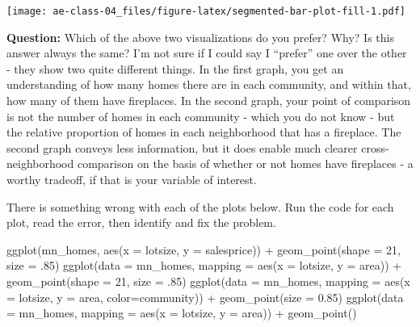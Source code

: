 \documentclass[
]{article}
\newenvironment{Shaded}{\begin{snugshade}}{\end{snugshade}}
\newcommand{\AttributeTok}[1]{\textcolor[rgb]{0.77,0.63,0.00}{#1}}
\newcommand{\DecValTok}[1]{\textcolor[rgb]{0.00,0.00,0.81}{#1}}
\newcommand{\FloatTok}[1]{\textcolor[rgb]{0.00,0.00,0.81}{#1}}
\newcommand{\FunctionTok}[1]{\textcolor[rgb]{0.00,0.00,0.00}{#1}}
\newcommand{\NormalTok}[1]{#1}
\newcommand{\SpecialCharTok}[1]{\textcolor[rgb]{0.00,0.00,0.00}{#1}}
\begin{document}
\texttt{[image: ae-class-04\_files/figure-latex/segmented-bar-plot-fill-1.pdf]}

\textbf{Question:} Which of the above two visualizations do you prefer?
Why? Is this answer always the same? I'm not sure if I could say I
``prefer'' one over the other - they show two quite different things. In
the first graph, you get an understanding of how many homes there are in
each community, and within that, how many of them have fireplaces. In
the second graph, your point of comparison is not the number of homes in
each community - which you do not know - but the relative proportion of
homes in each neighborhood that has a fireplace. The second graph
conveys less information, but it does enable much clearer
cross-neighborhood comparison on the basis of whether or not homes have
fireplaces - a worthy tradeoff, if that is your variable of interest.

There is something wrong with each of the plots below. Run the code for
each plot, read the error, then identify and fix the problem.

\begin{Shaded}
\begin{Highlighting}[]
\FunctionTok{ggplot}\NormalTok{(mn\_homes, }\FunctionTok{aes}\NormalTok{(}\AttributeTok{x =}\NormalTok{ lotsize, }\AttributeTok{y =}\NormalTok{ salesprice)) }\SpecialCharTok{+} 
  \FunctionTok{geom\_point}\NormalTok{(}\AttributeTok{shape =} \DecValTok{21}\NormalTok{, }\AttributeTok{size =}\NormalTok{ .}\DecValTok{85}\NormalTok{)}
\FunctionTok{ggplot}\NormalTok{(}\AttributeTok{data =}\NormalTok{ mn\_homes, }\AttributeTok{mapping =} \FunctionTok{aes}\NormalTok{(}\AttributeTok{x =}\NormalTok{ lotsize, }\AttributeTok{y =}\NormalTok{ area)) }\SpecialCharTok{+} 
  \FunctionTok{geom\_point}\NormalTok{(}\AttributeTok{shape =} \DecValTok{21}\NormalTok{, }\AttributeTok{size =}\NormalTok{ .}\DecValTok{85}\NormalTok{)}
\FunctionTok{ggplot}\NormalTok{(}\AttributeTok{data =}\NormalTok{ mn\_homes, }\AttributeTok{mapping =} \FunctionTok{aes}\NormalTok{(}\AttributeTok{x =}\NormalTok{ lotsize, }\AttributeTok{y =}\NormalTok{ area, }\AttributeTok{color=}\NormalTok{community)) }\SpecialCharTok{+}
  \FunctionTok{geom\_point}\NormalTok{(}\AttributeTok{size =} \FloatTok{0.85}\NormalTok{)}
\FunctionTok{ggplot}\NormalTok{(}\AttributeTok{data =}\NormalTok{ mn\_homes, }\AttributeTok{mapping =} \FunctionTok{aes}\NormalTok{(}\AttributeTok{x =}\NormalTok{ lotsize, }\AttributeTok{y =}\NormalTok{ area)) }\SpecialCharTok{+}
  \FunctionTok{geom\_point}\NormalTok{()}
\end{Highlighting}
\end{Shaded}
\end{document}

